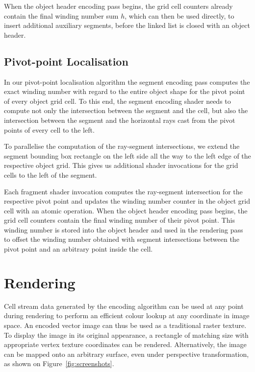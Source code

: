 \documentclass[11pt,a4paper,twoside]{article}
\begin{document}
When the object header encoding pass begins, the grid cell counters already contain the final winding number sum $h$, which can then be used directly, to insert additional auxiliary segments, before the linked list is closed with an object header.

\subsection {Pivot-point Localisation}

In our pivot-point localisation algorithm the segment encoding pass computes the exact winding number with regard to the entire object shape for the pivot point of every object grid cell. To this end, the segment encoding shader needs to compute not only the intersection between the segment and the cell, but also the intersection between the segment and the horizontal rays cast from the pivot points of every cell to the left.

To parallelise the computation of the ray-segment intersections, we extend the segment bounding box rectangle on the left side all the way to the left edge of the respective object grid. This gives us additional shader invocations for the grid cells to the left of the segment.

Each fragment shader invocation computes the ray-segment intersection for the respective pivot point and updates the winding number counter in the object grid cell with an atomic operation. When the object header encoding pass begins, the grid cell counters contain the final winding number of their pivot point. This winding number is stored into the object header and used in the rendering pass to offset the winding number obtained with segment intersections between the pivot point and an arbitrary point inside the cell.

\section {Rendering}

Cell stream data generated by the encoding algorithm can be used at any point during rendering to perform an efficient colour lookup at any coordinate in image space. An encoded vector image can thus be used as a traditional raster texture. To display the image in its original appearance, a rectangle of matching size with appropriate vertex texture coordinates can be rendered. Alternatively, the image can be mapped onto an arbitrary surface, even under perspective transformation, as shown on Figure~\ref{fig:screenshots}.
\end{document}
